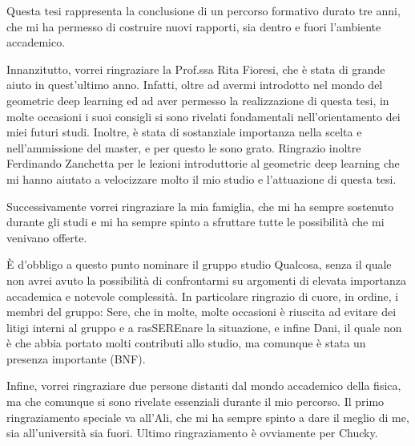 \documentclass[12pt,a4paper]{report}
\theoremstyle{definition}
\begin{document}
Questa tesi rappresenta la conclusione di un percorso formativo durato tre anni, che mi ha permesso di costruire nuovi rapporti, sia dentro e fuori l'ambiente accademico.

Innanzitutto, vorrei ringraziare la Prof.ssa Rita Fioresi, che è stata di grande aiuto in quest'ultimo anno.
Infatti, oltre ad avermi introdotto nel mondo del geometric deep learning ed ad aver permesso la realizzazione di questa tesi, in molte occasioni i suoi consigli si sono rivelati fondamentali nell'orientamento dei miei futuri studi.
Inoltre, è stata di sostanziale importanza nella scelta e nell'ammissione del master, e per questo le sono grato.
Ringrazio inoltre Ferdinando Zanchetta per le lezioni introduttorie al geometric deep learning che mi hanno aiutato a velocizzare molto il mio studio e l'attuazione di questa tesi.

Successivamente vorrei ringraziare la mia famiglia, che mi ha sempre sostenuto durante gli studi e mi ha sempre spinto a sfruttare tutte le possibilità che mi venivano offerte.

È d'obbligo a questo punto nominare il gruppo studio Qualcosa, senza il quale non avrei avuto la possibilità di confrontarmi su argomenti di elevata importanza accademica e notevole complessità.
In particolare ringrazio di cuore, in ordine, i membri del gruppo:
Sere, che in molte, molte occasioni è riuscita ad evitare dei litigi interni al gruppo e a rasSEREnare la situazione, e infine
Dani, 
il quale non è che abbia portato molti contributi allo studio, ma comunque è stata un presenza importante (BNF).

Infine, vorrei ringraziare due persone distanti dal mondo accademico della fisica, ma che comunque si sono rivelate essenziali durante il mio percorso.
Il primo ringraziamento speciale va all'Ali, che mi ha sempre spinto a dare il meglio di me, sia all'università sia fuori.
Ultimo ringraziamento è ovviamente per Chucky.
\end{document}
